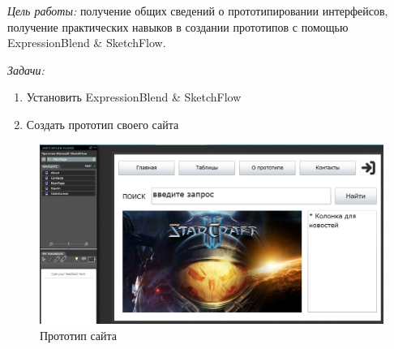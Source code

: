 \documentclass[pscyr, nonums]{hedlab}
\date{}
\begin{document}
    \makeheader
    \emph{Цель работы:} получение общих сведений о прототипировании интерфейсов, получение практических навыков в создании прототипов с помощью 
    ExpressionBlend \& SketchFlow.

    \emph{Задачи:}
    \begin{enumerate}\itemsep-5pt
        \item Установить ExpressionBlend \& SketchFlow
        \item Создать прототип своего сайта
    \end{enumerate}

    \begin{figure}[h!]
        \center
        \includegraphics[width=1\textwidth]{Lab02_01}
        \caption{Прототип сайта}
    \end{figure}
\end{document}
